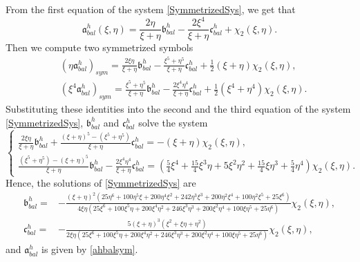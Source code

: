 \documentclass[10pt]{amsart}
\theoremstyle{remark}
\theoremstyle{definition}
\numberwithin{equation}{section}
\newcommand{\f}{\frac}
\begin{document}
From the first equation of the system \eqref{SymmetrizedSys}, we get that
\begin{equation} \label{ahbalsym}
   \mathfrak{a}^{h}_{bal}(\xi, \eta) = \f{2\eta}{\xi + \eta} \mathfrak{b}^{h}_{bal} -  \f{2\xi^4}{\xi + \eta} \mathfrak{c}^{h}_{bal} + \chi_2(\xi,\eta).
\end{equation}
Then we compute two symmetrized symbols
\begin{align*}
&(\eta\mathfrak{a}^{h}_{bal})_{sym}= \f{2\xi\eta}{\xi + \eta} \mathfrak{b}^{h}_{bal} - \f{\xi^5+\eta^5}{\xi+\eta}\mathfrak{c}^{h}_{bal}+ \f12(\xi+\eta)\chi_2(\xi, \eta),\\
&(\xi^4 \mathfrak{a}^{h}_{bal})_{sym}= \f{\xi^5+\eta^5}{\xi + \eta} \mathfrak{b}^{h}_{bal} - \f{2\xi^4\eta^4}{\xi+\eta}\mathfrak{c}^{h}_{bal}+ \f12(\xi^4+\eta^4)\chi_2(\xi, \eta).
\end{align*}
Substituting these identities into the second and the third equation of the system \eqref{SymmetrizedSys}, $\mathfrak{b}^{h}_{bal}$ and $\mathfrak{c}^{h}_{bal}$ solve the system
\begin{equation*}
\begin{cases}
\f{2\xi\eta}{\xi + \eta} \mathfrak{b}^{h}_{bal} +\f{(\xi+\eta)^5-(\xi^5+\eta^5)}{\xi+\eta}\mathfrak{c}^{h}_{bal}= -(\xi+\eta)\chi_{2}(\xi,\eta),\\
\f{(\xi^5+\eta^5)-(\xi+\eta)^5}{\xi + \eta} \mathfrak{b}^{h}_{bal} - \f{2\xi^4\eta^4}{\xi+\eta}\mathfrak{c}^{h}_{bal}=\left(\f54\xi^4+\f{15}{4}\xi^3\eta+5\xi^2 \eta^2 + \f{15}{4}\xi\eta^3 + \f54 \eta^4\right)\chi_{2}(\xi,\eta).
\end{cases}
\end{equation*}
Hence, the solutions of \eqref{SymmetrizedSys} are
\begin{align*}
\mathfrak{b}^{h}_{bal}=&-\f{(\xi+\eta)^2(25\eta^6+100\eta^5\xi+200\eta^4\xi^2+242\eta^3\xi^3+200\eta^2\xi^4+100\eta^2\xi^5+25\xi^6)}{4\xi\eta(25\xi^6+100\xi^5\eta+200\xi^4\eta^2+246\xi^3\eta^3+200\xi^2\eta^4+100\xi\eta^5+25\eta^6)}\chi_{2}(\xi,\eta),\\
\mathfrak{c}^{h}_{bal}=&-\f{5(\xi+\eta)^3(\xi^2+\xi\eta+\eta^2)}{2\xi\eta(25\xi^6+100\xi^5\eta+200\xi^4\eta^2+246\xi^3\eta^3+200\xi^2\eta^4+100\xi\eta^5+25\eta^6)}\chi_{2}(\xi,\eta),
\end{align*}
and $\mathfrak{a}^{h}_{bal}$ is given by \eqref{ahbalsym}.
\end{document}
